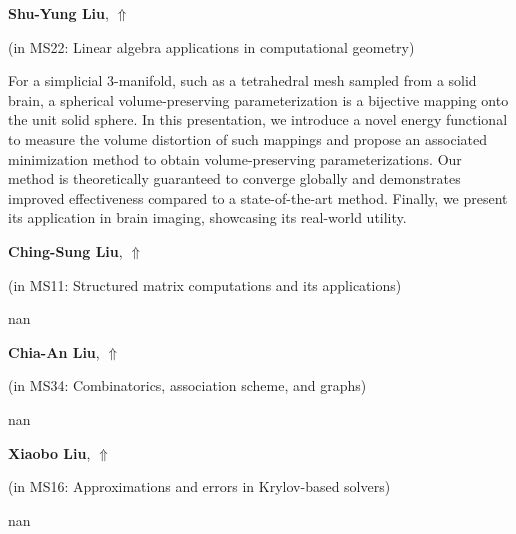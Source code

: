 \documentclass[ILAS2025-program.tex]{subfiles}
\begin{document}
     \hypertarget{down0067}{}\begin{ilasabstract}
    
    \textbf{Shu-Yung Liu},  \hfill \hyperlink{up0067}{$\Uparrow$}
    
    (in {\color{mstitle}MS22: Linear algebra applications in computational geometry})
        
        \mtskip
    For a simplicial $3$-manifold, such as a tetrahedral mesh sampled from a solid brain, a spherical volume-preserving parameterization is a bijective mapping onto the unit solid sphere. In this presentation, we introduce a novel energy functional to measure the volume distortion of such mappings and propose an associated minimization method to obtain volume-preserving parameterizations. Our method is theoretically guaranteed to converge globally and demonstrates improved effectiveness compared to a state-of-the-art method. Finally, we present its application in brain imaging, showcasing its real-world utility.\end{ilasabstract}
     \hypertarget{down0235}{}\begin{ilasabstract}
    
    \textbf{Ching-Sung Liu},  \hfill \hyperlink{up0235}{$\Uparrow$}
    
    (in {\color{mstitle}MS11: Structured matrix computations and its applications})
        
        \mtskip
    nan\end{ilasabstract}
     \hypertarget{down0287}{}\begin{ilasabstract}
    
    \textbf{Chia-An Liu},  \hfill \hyperlink{up0287}{$\Uparrow$}
    
    (in {\color{mstitle}MS34: Combinatorics, association scheme, and graphs})
        
        \mtskip
    nan\end{ilasabstract}
     \hypertarget{down0303}{}\begin{ilasabstract}
    
    \textbf{Xiaobo Liu},  \hfill \hyperlink{up0303}{$\Uparrow$}
    
    (in {\color{mstitle}MS16: Approximations and errors in Krylov-based solvers})
        
        \mtskip
    nan\end{ilasabstract}
\end{document}
